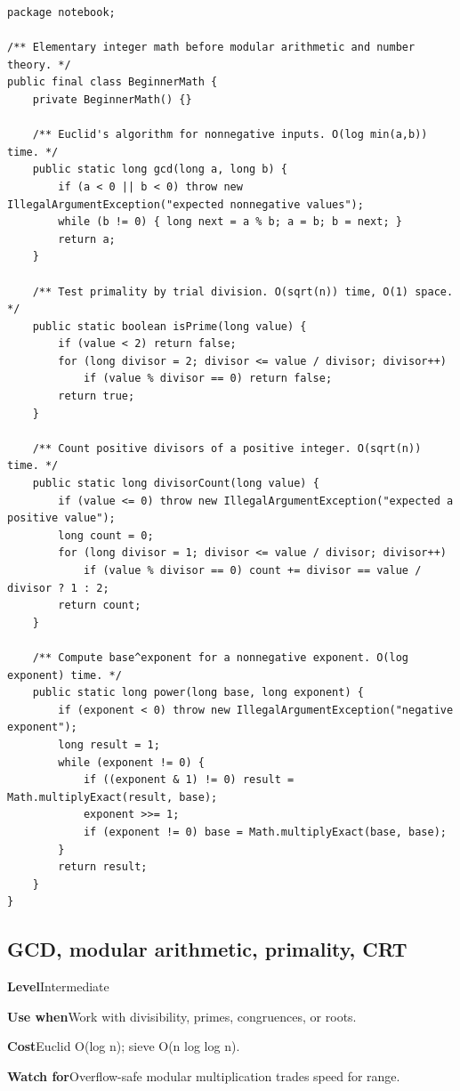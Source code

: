 \documentclass[10pt,letterpaper]{article}
\newcommand{\entrylabel}[1]{\textcolor{accent}{\bfseries #1}}
\begin{document}
\begin{lstlisting}
package notebook;

/** Elementary integer math before modular arithmetic and number theory. */
public final class BeginnerMath {
    private BeginnerMath() {}

    /** Euclid's algorithm for nonnegative inputs. O(log min(a,b)) time. */
    public static long gcd(long a, long b) {
        if (a < 0 || b < 0) throw new IllegalArgumentException("expected nonnegative values");
        while (b != 0) { long next = a % b; a = b; b = next; }
        return a;
    }

    /** Test primality by trial division. O(sqrt(n)) time, O(1) space. */
    public static boolean isPrime(long value) {
        if (value < 2) return false;
        for (long divisor = 2; divisor <= value / divisor; divisor++)
            if (value % divisor == 0) return false;
        return true;
    }

    /** Count positive divisors of a positive integer. O(sqrt(n)) time. */
    public static long divisorCount(long value) {
        if (value <= 0) throw new IllegalArgumentException("expected a positive value");
        long count = 0;
        for (long divisor = 1; divisor <= value / divisor; divisor++)
            if (value % divisor == 0) count += divisor == value / divisor ? 1 : 2;
        return count;
    }

    /** Compute base^exponent for a nonnegative exponent. O(log exponent) time. */
    public static long power(long base, long exponent) {
        if (exponent < 0) throw new IllegalArgumentException("negative exponent");
        long result = 1;
        while (exponent != 0) {
            if ((exponent & 1) != 0) result = Math.multiplyExact(result, base);
            exponent >>= 1;
            if (exponent != 0) base = Math.multiplyExact(base, base);
        }
        return result;
    }
}
\end{lstlisting}
\subsection{GCD, modular arithmetic, primality, CRT}
\begin{guidebox}\small
\entrylabel{Level}\quad Intermediate\par
\entrylabel{Use when}\quad Work with divisibility, primes, congruences, or roots.\par
\entrylabel{Cost}\quad Euclid O(log n); sieve O(n log log n).\par
\entrylabel{Watch for}\quad Overflow-safe modular multiplication trades speed for range.\par
\end{guidebox}
\end{document}
